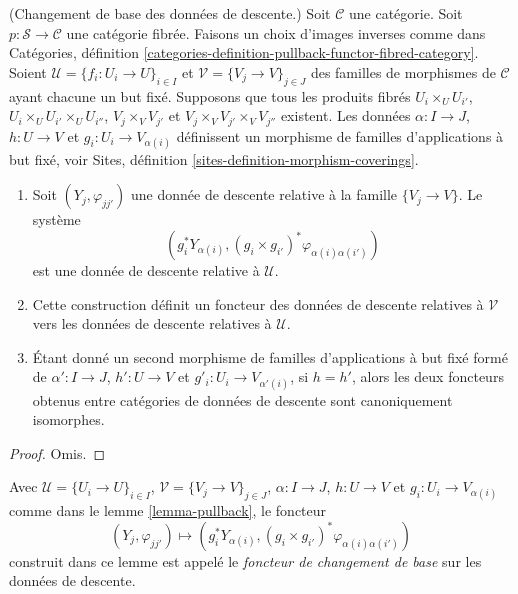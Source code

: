 \begin{lemma}
\label{lemma-pullback}
(Changement de base des données de descente.)
Soit $\mathcal{C}$ une catégorie.
Soit $p : \mathcal{S} \to \mathcal{C}$ une catégorie fibrée.
Faisons un choix d'images inverses comme dans Catégories,
définition \ref{categories-definition-pullback-functor-fibred-category}.
Soient $\mathcal{U} = \{f_i : U_i \to U\}_{i \in I}$ et
$\mathcal{V} = \{V_j \to V\}_{j \in J}$
des familles de morphismes de $\mathcal{C}$ ayant chacune un but fixé.
Supposons que tous les produits fibrés
$U_i \times_U U_{i'}$, $U_i \times_U U_{i'} \times_U U_{i''}$,
$V_j \times_V V_{j'}$ et $V_j \times_V V_{j'} \times_V V_{j''}$ existent.
Les données $\alpha : I \to J$, $h : U \to V$ et
$g_i : U_i \to V_{\alpha(i)}$ définissent un morphisme de familles
d'applications à but fixé, voir
Sites, définition \ref{sites-definition-morphism-coverings}.
\begin{enumerate}
\item Soit $(Y_j, \varphi_{jj'})$ une donnée de descente relative à la
famille $\{V_j \to V\}$. Le système
$$
\left(
g_i^*Y_{\alpha(i)},
(g_i \times g_{i'})^*\varphi_{\alpha(i)\alpha(i')}
\right)
$$
est une donnée de descente relative à $\mathcal{U}$.
\item Cette construction définit un foncteur des données de descente relatives
à $\mathcal{V}$ vers les données de descente relatives à $\mathcal{U}$.
\item Étant donné un second morphisme de familles d'applications à but fixé
formé de $\alpha' : I \to J$, $h' : U \to V$ et
$g'_i : U_i \to V_{\alpha'(i)}$, si $h = h'$, alors les deux foncteurs
obtenus entre catégories de données de descente sont canoniquement isomorphes.
\end{enumerate}
\end{lemma}

\begin{proof}
Omis.
\end{proof}

\begin{definition}
\label{definition-pullback-functor}
Avec $\mathcal{U} = \{U_i \to U\}_{i \in I}$,
$\mathcal{V} = \{V_j \to V\}_{j \in J}$,
$\alpha : I \to J$, $h : U \to V$ et
$g_i : U_i \to V_{\alpha(i)}$ comme dans le lemme \ref{lemma-pullback},
le foncteur
$$
(Y_j, \varphi_{jj'}) \longmapsto
(g_i^*Y_{\alpha(i)}, (g_i \times g_{i'})^*\varphi_{\alpha(i)\alpha(i')})
$$
construit dans ce lemme est appelé le {\it foncteur de changement de base}
sur les données de descente.
\end{definition}

